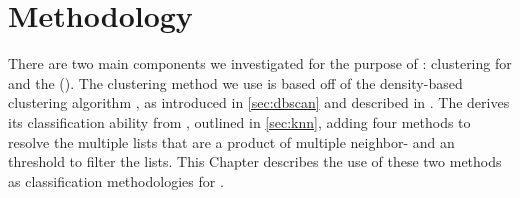 \chapter{\MSTlong{} Methodology}\label{chap:methodology}
There are two main components we investigated for the purpose of \mst{}: 
clustering for \bslongs{}
and
the \kraplong{} (\krap{}).
The clustering method we use is based off of the density-based clustering algorithm \dbscan, as introduced in \autoref{sec:dbscan} and described in \cite{johnson2015density}.
The \krap{} derives its classification ability from \kNNlong{}, outlined in \autoref{sec:knn}, adding four methods to resolve the multiple \knnlong{} lists that are a product of multiple neighbor-\compfuncs{} and an \a{} threshold to filter the \knnlong{} lists.
This Chapter describes the use of these two methods as classification methodologies for \cplop{}.






